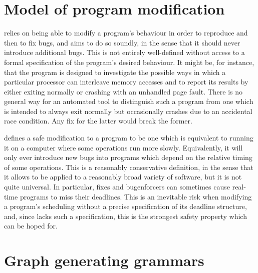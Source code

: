 \section{Model of program modification}
\label{sect:intro:theory_of_fixing}

{\Technique} relies on being able to modify a program's behaviour in
order to reproduce and then to fix bugs, and aims to do so soundly, in
the sense that it should never introduce additional bugs.  This is not
entirely well-defined without access to a formal specification of the
program's desired behaviour.  It might be, for instance, that the
program is designed to investigate the possible ways in which a
particular processor can interleave memory accesses and to report its
results by either exiting normally or crashing with an unhandled page
fault.  There is no general way for an automated tool to distinguish
such a program from one which is intended to always exit normally but
occasionally crashes due to an accidental race condition.  Any fix for
the latter would break the former.

{\Technique} defines a safe modification to a program to be one which
is equivalent to running it on a computer where some operations run
more slowly.  Equivalently, it will only ever introduce new bugs into
programs which depend on the relative timing of some operations.  This
is a reasonably conservative definition, in the sense that it allows
{\technique} to be applied to a reasonably broad variety of software,
but it is not quite universal.  In particular, {\technique} fixes and
\glspl{bugenforcer} can sometimes cause real-time programs to miss
their deadlines.  This is an inevitable risk when modifying a
program's scheduling without a precise specification of its deadline
structure, and, since {\technique} lacks such a specification, this is
the strongest safety property which can be hoped for.

\section{Graph generating grammars}
\label{sect:intro:graph_grammar}

